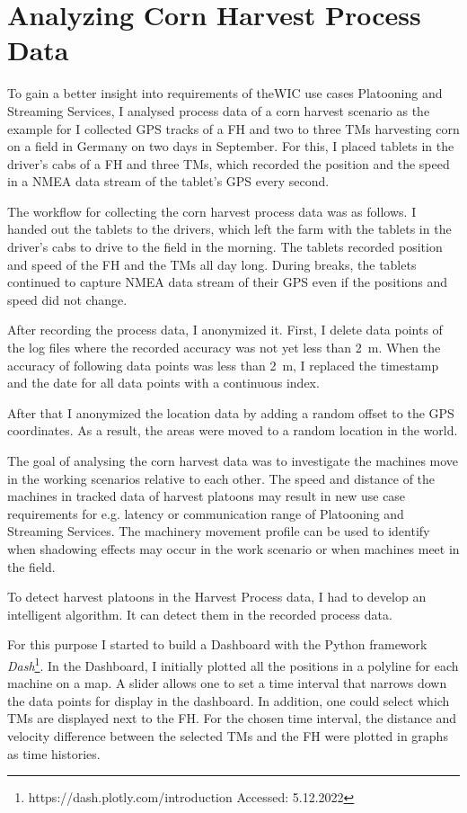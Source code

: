 \documentclass[]{nsm-thesis}
\begin{document}
\chapter{Analyzing Corn Harvest Process Data}

To gain a better insight into requirements of the\ac{WIC} use cases Platooning and Streaming Services, I analysed process data of a corn harvest scenario as the example for I collected GPS tracks of a \ac{FH} and two to three \ac{TM}s harvesting corn on a field in Germany on two days in September. For this, I placed tablets in the driver's cabs of a \ac{FH} and three \ac{TM}s, which recorded the position and the speed in a NMEA data stream of the tablet's GPS every second. 

The workflow for collecting the corn harvest process data was as follows. 
I handed out the tablets to the drivers, which left the farm with the tablets in the driver's cabs to drive to the field in the morning. The tablets recorded position and speed of the \ac{FH} and the \ac{TM}s all day long. During breaks, the tablets continued to capture NMEA data stream of their GPS even if the positions and speed did not change.

After recording the process data, I anonymized it. 
First, I delete data points of the log files where the recorded accuracy was not yet less than \SI{2}{\metre}. When the accuracy of following data points was less than \SI{2}{\metre}, I replaced the timestamp and the date for all data points with a continuous index.

After that I anonymized the location data by adding a random offset to the GPS coordinates. As a result, the areas were moved to a random location in the world.

The goal of analysing the corn harvest data was to investigate the machines move in the working scenarios relative to each other. The speed and distance of the machines in tracked data of harvest platoons may result in new use case requirements for e.g. latency or communication range of Platooning and Streaming Services. The machinery movement profile can be used to identify when shadowing effects may occur in the work scenario or when machines meet in the field.

To detect harvest platoons in the Harvest Process data, I had to develop an intelligent algorithm. It can detect them in the recorded process data.

For this purpose I started to build a Dashboard with the Python framework \textit{Dash}\footnote{https://dash.plotly.com/introduction Accessed: 5.12.2022}. In the Dashboard, I initially plotted all the positions in a polyline for each machine on a map. A slider allows one to set a time interval that narrows down the data points for display in the dashboard. In addition, one could select which \ac{TM}s are displayed next to the \ac{FH}. For the chosen time interval, the distance and velocity difference between the selected \ac{TM}s and the \ac{FH} were plotted in graphs as time histories. 
\end{document}

